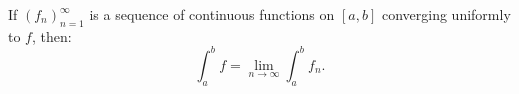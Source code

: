 If $(f_n)_{n=1}^{\infty}$ is a sequence of continuous functions on $[a, b]$ converging uniformly to $f$, then:
\[
\int_a^b f = \lim_{n \to \infty} \int_a^b f_n.
\]
